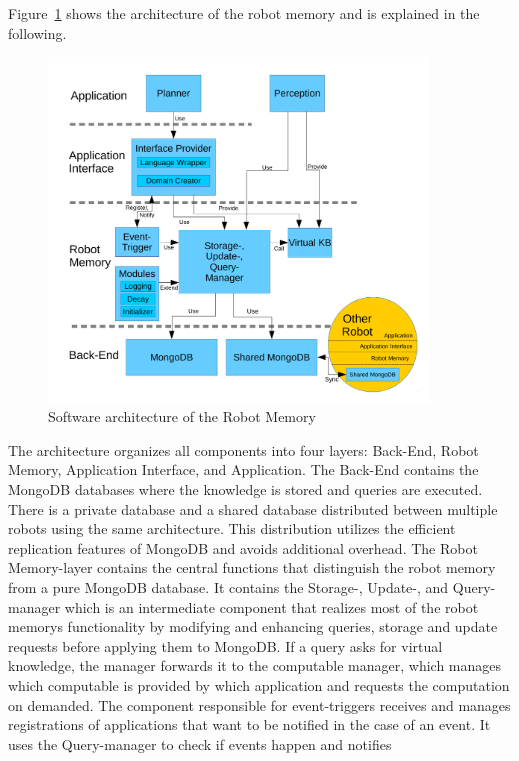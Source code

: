 \documentclass[a4paper,11pt]{article}
\newcommand{\reffig}[1]{Figure~\ref{#1}}
\begin{document}
\reffig{fig:arch} shows the architecture of the robot
memory and is explained in the following.
\begin{figure}
  \centering
  \includegraphics[width=0.9\textwidth]{architecture.pdf}
  \vspace{-5mm}
  \caption{Software architecture of the Robot Memory}
  \label{fig:arch}
\end{figure}
The architecture organizes all components
into four layers: Back-End, Robot Memory, Application Interface,
and Application. The Back-End contains the MongoDB databases where the
knowledge is stored and queries are executed. There is a private
database and a shared database distributed between multiple robots
using the same architecture. This distribution utilizes the efficient
replication features of MongoDB and avoids additional overhead. The
Robot Memory-layer contains the central functions that distinguish the
robot memory from a pure MongoDB database. It contains the Storage-,
Update-, and Query-manager which is an intermediate component that
realizes most of the robot memorys functionality by modifying and
enhancing queries, storage and update requests before applying them to
MongoDB. If a query asks for virtual knowledge, the manager forwards
it to the computable manager, which
manages which computable is provided by which application and
requests the computation on demanded. The
component responsible for event-triggers receives and manages
registrations of applications that want to be notified in the case of
an event. It uses the Query-manager to check if events happen and notifies
\end{document}
